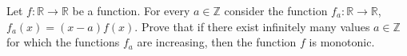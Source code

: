 Let $f:\mathbb{R} \to\mathbb{R}$ be a function. For every $a\in\mathbb{Z}$ consider the function $f_a : \mathbb{R} \to\mathbb{R}$, $f_a(x) = (x - a)f(x)$. Prove that if there exist infinitely many values $a\in\mathbb{Z}$ for which the functions $f_a$ are increasing, then the function $f$ is monotonic.